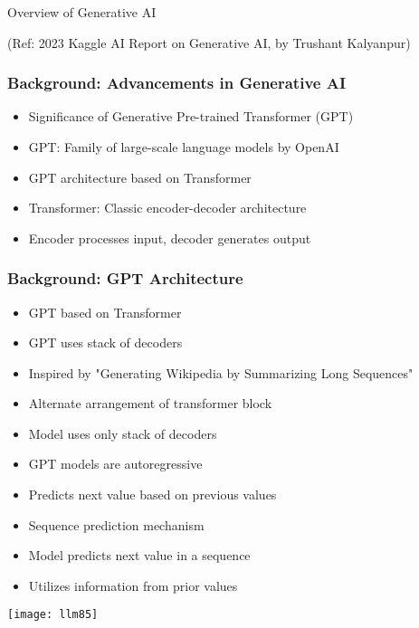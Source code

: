 \begin{frame}[fragile]\frametitle{}
\begin{center}
{\Large Overview of Generative AI}
\end{center}

{\tiny (Ref: 2023 Kaggle AI Report on Generative AI, by Trushant Kalyanpur)}

\end{frame}

\begin{frame}[fragile]\frametitle{Background: Advancements in Generative AI}
    
    \begin{itemize}
        \item Significance of Generative Pre-trained Transformer (GPT)
        \item GPT: Family of large-scale language models by OpenAI
        \item GPT architecture based on Transformer
        \item Transformer: Classic encoder-decoder architecture
        \item Encoder processes input, decoder generates output
    \end{itemize}
\end{frame}

\begin{frame}[fragile]\frametitle{Background: GPT Architecture}

\begin{itemize}
        \item GPT based on Transformer
        \item GPT uses stack of decoders
        \item Inspired by "Generating Wikipedia by Summarizing Long Sequences"
        \item Alternate arrangement of transformer block
        \item Model uses only stack of decoders
        \item GPT models are autoregressive
        \item Predicts next value based on previous values
        \item Sequence prediction mechanism
        \item Model predicts next value in a sequence
        \item Utilizes information from prior values		
\end{itemize}	

\begin{center}
\texttt{[image: llm85]}
\end{center}		

\end{frame}

